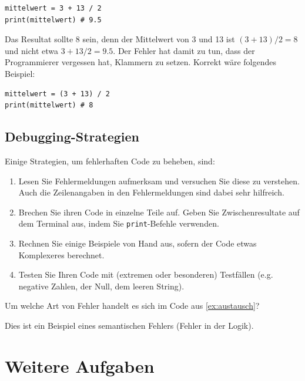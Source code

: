 \begin{lstlisting}
mittelwert = 3 + 13 / 2
print(mittelwert) # 9.5
\end{lstlisting}
Das Resultat sollte 8 sein, denn der Mittelwert von 3 und 13 ist $(3 + 13) / 2 = 8$ und nicht etwa $3 + 13 / 2 = 9.5$. Der Fehler hat damit zu tun, dass der Programmierer vergessen hat, Klammern zu setzen. Korrekt wäre folgendes Beispiel:
\begin{lstlisting}
mittelwert = (3 + 13) / 2
print(mittelwert) # 8
\end{lstlisting}

\subsection{Debugging-Strategien}
Einige Strategien, um fehlerhaften Code zu beheben, sind:
\begin{enumerate}
	\item Lesen Sie Fehlermeldungen aufmerksam und versuchen Sie diese zu verstehen. Auch die Zeilenangaben in den Fehlermeldungen sind dabei sehr hilfreich.
	\item Brechen Sie ihren Code in einzelne Teile auf. Geben Sie Zwischenresultate auf dem Terminal aus, indem Sie \lstinline|print|-Befehle verwenden.
	\item Rechnen Sie einige Beispiele von Hand aus, sofern der Code etwas Komplexeres berechnet.
	\item Testen Sie Ihren Code mit (extremen oder besonderen) Testfällen (e.g. negative Zahlen, der Null, dem leeren String).
\end{enumerate}

\begin{myexercise}\label{myexercise:austausch-debug}
	Um welche Art von Fehler handelt es sich im Code aus \cref{ex:austausch}?
	\begin{myanswer}
		Dies ist ein Beispiel eines semantischen Fehlers (Fehler in der Logik).
	\end{myanswer}
\end{myexercise}



\clearpage
\section{Weitere Aufgaben}



